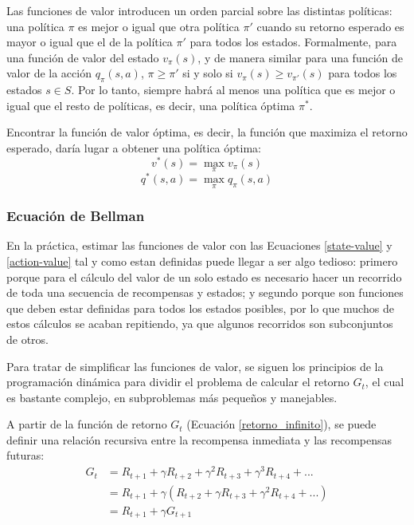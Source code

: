 Las funciones de valor introducen un orden parcial sobre las distintas políticas: una política $\pi$ es mejor o igual que otra política $\pi'$ cuando su retorno esperado es mayor o igual que el de la política $\pi'$ para todos los estados. Formalmente, para una función de valor del estado $v_\pi(s)$, y de manera similar para una función de valor de la acción $q_\pi(s,a)$, $\pi \geq \pi'$ si y solo si $v_\pi(s) \geq v_{\pi'}(s)$ para todos los estados $s \in S$. Por lo tanto, siempre habrá al menos una política que es mejor o igual que el resto de políticas, es decir, una política óptima $\pi^{*}$.

Encontrar la función de valor óptima, es decir, la función que maximiza el retorno esperado, daría lugar a obtener una política óptima:
\begin{equation}
    v^{*}(s) = \max_{\pi} v_{\pi}(s)
\end{equation}
\begin{equation}
    q^{*}(s,a) = \max_{\pi} q_{\pi}(s, a)
\end{equation}

\subsubsection{Ecuación de Bellman}

En la práctica, estimar las funciones de valor con las Ecuaciones \ref{state-value} y \ref{action-value} tal y como estan definidas puede llegar a ser algo tedioso: primero porque para el cálculo del valor de un solo estado es necesario hacer un recorrido de toda una secuencia de recompensas y estados; y segundo porque son funciones que deben estar definidas para todos los estados posibles, por lo que muchos de estos cálculos se acaban repitiendo, ya que algunos recorridos son subconjuntos de otros.

Para tratar de simplificar las funciones de valor, se siguen los principios de la programación dinámica para dividir el problema de calcular el retorno $G_t$, el cual es bastante complejo, en subproblemas más pequeños y manejables.

A partir de la función de retorno $G_t$ (Ecuación \ref{retorno_infinito}), se puede definir una relación recursiva entre la recompensa inmediata y las recompensas futuras:
\begin{equation}
\begin{split}
    G_t &= R_{t+1} + \gamma R_{t+2} + \gamma^2R_{t+3} + \gamma^3R_{t+4} + ... \\
    &= R_{t+1} + \gamma (R_{t+2} + \gamma R_{t+3} + \gamma^2R_{t+4} + ...) \\
    &= R_{t+1} + \gamma G_{t+1} \\
\end{split}
\end{equation}

